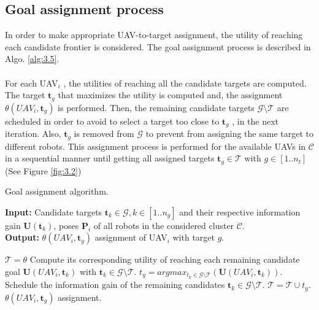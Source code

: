 \documentclass[11pt,openany]{book}
\begin{document}
\subsection{Goal assignment process}
In order to make appropriate UAV-to-target assignment, the utility of reaching each candidate frontier is considered. The goal assignment process is described in Algo. \ref{alg:3.5}.\\\\
For each UAV$_i$ , the utilities of reaching all the candidate targets are computed. The target $\mathbf{t}_g$ that maximizes the utility is computed and, the assignment $\theta(UAV_i,\mathbf{t}_g)$ is performed. Then, the remaining candidate targets $\mathcal{G}\setminus \mathcal{T}$ are scheduled in order to avoid to select a target too close to $\mathbf{t}_g$ , in the next iteration. Also, $\mathbf{t}_g$ is removed from $\mathcal{G}$ to prevent from assigning the same target to different robots. This assignment process is performed for the available UAVs in $\mathcal{C}$ in a sequential manner until getting all assigned targets $\mathbf{t}_g \in \mathcal{T}$ with $g \in [1..n_t]$ (See Figure \ref{fig:3.2})
\begin{algorithm}[H]
    \caption{Goal assignment algorithm.}
    \label{alg:3.5}
    \hspace*{\algorithmicindent} \textbf{Input:} {Candidate targets $\mathbf{t}_k \in \mathcal{G}, k \in [1..n_g]$ and their respective information gain $\mathbf{U}(\mathbf{t}_k)$, poses $\mathbf{P}_i$ of all robots in the considered cluster $\mathcal{C}$.}\\
    \hspace*{\algorithmicindent} \textbf{Output:} {$\theta(UAV_i,\mathbf{t}_g)$ assignment of UAV$_i$ with target $g$.}
    \begin{algorithmic}[1]
        \STATE $\mathcal{T}=\theta$
        \STATE Compute its corresponding utility of reaching each remaining candidate goal $\mathbf{U}(UAV_i,\mathbf{t}_k)$ with $\mathbf{t}_k \in \mathcal{G}\setminus \mathcal{T}$.
        \STATE $t_g=argmax_{t_k \in \mathcal{G}\setminus \mathcal{T}}(\mathbf{U}(UAV_i,\mathbf{t}_k))$.
        \STATE Schedule the information gain of the remaining candidates $\mathbf{t}_k \in \mathcal{G} \setminus \mathcal{T}$.
        \STATE $\mathcal{T}=\mathcal{T}\cup t_g$.
        \ENDWHILE
        \RETURN $\theta(UAV_i, \mathbf{t}_g)$ assignment.
    \end{algorithmic}
\end{algorithm}
\end{document}
